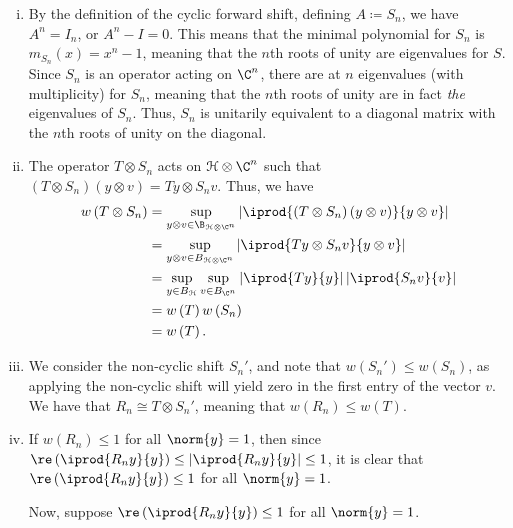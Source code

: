 \documentclass[10pt]{mypackage}
\begin{document}
\begin{solution}\hfill
  \begin{enumerate}[(i)]
    \item By the definition of the cyclic forward shift, defining $A \coloneq S_n$, we have $A^n = I_n$, or $A^n - I = 0$. This means that the minimal polynomial for $S_n$ is $m_{S_n}\left( x \right) = x^n - 1$, meaning that the $n$th roots of unity are eigenvalues for $S$. Since $S_n$ is an operator acting on $\C^n$, there are at $n$ eigenvalues (with multiplicity) for $S_n$, meaning that the $n$th roots of unity are in fact \textit{the} eigenvalues of $S_n$. Thus, $S_n$ is unitarily equivalent to a diagonal matrix with the $n$th roots of unity on the diagonal.
    \item The operator $T\otimes S_n$ acts on $\mathcal{H}\otimes \C^n$ such that $\left( T\otimes S_n \right)\left( y\otimes v \right) = Ty \otimes S_n v$. Thus, we have
      \begin{align*}
        w\left( T\otimes S_n \right) &= \sup_{y\otimes v\in \B_{\mathcal{H}\otimes \C^n}} \left\vert \iprod{\left( T\otimes S_n \right)\left( y\otimes v \right)}{y\otimes v} \right\vert\\
                                     &= \sup_{y\otimes v\in B_{\mathcal{H}\otimes \C^n}}\left\vert \iprod{Ty\otimes S_n v}{y\otimes v} \right\vert\\
                                     &= \sup_{y\in B_{\mathcal{H}}}\sup_{v\in B_{\C^n}} \left\vert \iprod{Ty}{y} \right\vert \left\vert \iprod{S_n v}{v} \right\vert\\
                                     &= w\left( T \right)w\left( S_n \right)\\
                                     &= w\left( T \right).
      \end{align*}
    \item We consider the non-cyclic shift $S_n'$, and note that $w\left( S_n' \right)\leq w\left( S_n \right)$, as applying the non-cyclic shift will yield zero in the first entry of the vector $v$. We have that $R_n \cong T\otimes S_n'$, meaning that $w\left( R_n \right)\leq w\left( T \right)$.
    \item If $w\left( R_n \right)\leq 1$ for all $\norm{y} = 1$, then since $\re\left( \iprod{R_ny}{y} \right)\leq \left\vert \iprod{R_ny}{y} \right\vert \leq 1$, it is clear that $\re\left( \iprod{R_n y}{y} \right)\leq 1$ for all $\norm{y} = 1$.\newline

      Now, suppose $\re\left( \iprod{R_ny}{y} \right)\leq 1$ for all $\norm{y} = 1$.
  \end{enumerate}
\end{solution}
\end{document}
